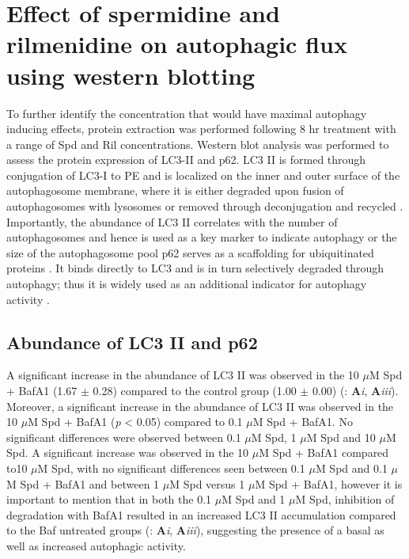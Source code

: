 {\section{Effect of spermidine and rilmenidine on autophagic flux using western blotting}
To further identify the concentration that would have maximal autophagy inducing effects, protein extraction was performed following 8 hr treatment with a range of Spd and Ril concentrations. Western blot analysis was performed to assess the protein expression of LC3-II and p62. LC3 II is formed through conjugation of LC3-I to PE and is localized on the inner and outer surface of the autophagosome membrane, where it is either degraded upon fusion of autophagosomes with lysosomes or removed through deconjugation and recycled \citep{kabeya2000}. Importantly, the abundance of LC3 II correlates with the number of autophagosomes and hence is used as a key marker to indicate autophagy or the size of the autophagosome pool \citep{loos2014} p62 serves as a scaffolding for ubiquitinated proteins \citep{sahani2014}. It binds directly to LC3 and is in turn selectively degraded through autophagy; thus it is widely used as an additional indicator for autophagy activity \citep{pankiv2007}.

\subsection{Abundance of LC3 II and p62}
A significant increase in the abundance of LC3 II was observed in the 10 $\mu$M Spd + BafA1 (1.67 $\pm$ 0.28) compared to the control group (1.00 $\pm$ 0.00) (: \textbf{A}\textit{i}, \textbf{A}\textit{iii}). Moreover, a significant increase in the abundance of LC3 II was observed in the 10 $\mu$M Spd + BafA1 (\textit{p} < 0.05) compared to 0.1 $\mu$M Spd + BafA1. No significant differences were observed between 0.1 $\mu$M Spd, 1 $\mu$M Spd and 10 $\mu$M Spd. A significant increase was observed in the 10 $\mu$M Spd + BafA1 compared to10 $\mu$M Spd, with no significant differences seen between 0.1 $\mu$M Spd and 0.1 $\mu$M Spd + BafA1 and between 1 $\mu$M Spd versus 1 $\mu$M Spd + BafA1, however it is important to mention that in both the 0.1 $\mu$M Spd  and 1 $\mu$M Spd, inhibition of degradation with BafA1 resulted in an increased LC3 II accumulation compared to the Baf untreated groups (: \textbf{A}\textit{i}, \textbf{A}\textit{iii}), suggesting the presence of a basal as well as increased autophagic activity.

}
